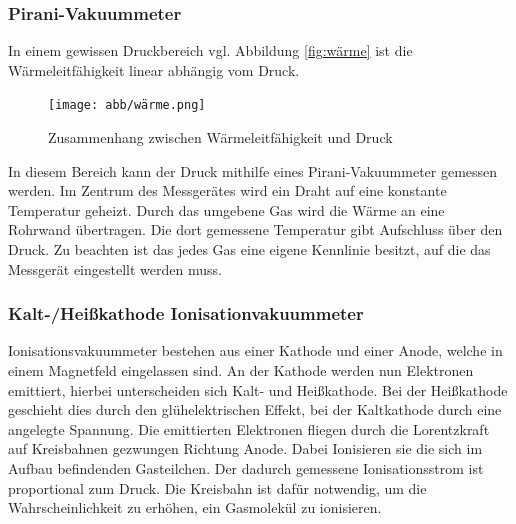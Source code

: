 \subsubsection{Pirani-Vakuummeter}
In einem gewissen Druckbereich vgl. Abbildung \eqref{fig:wärme} ist die Wärmeleitfähigkeit linear abhängig vom Druck.
\begin{figure}[h]
    \centering
    \texttt{[image: abb/wärme.png]}
    \caption{Zusammenhang zwischen Wärmeleitfähigkeit und Druck \cite{Pfeifer}}
    \label{fig:wärme}
\end{figure}
In diesem Bereich kann der Druck mithilfe eines Pirani-Vakuummeter gemessen werden.
Im Zentrum des Messgerätes wird ein Draht auf eine konstante Temperatur geheizt.
Durch das umgebene Gas wird die Wärme an eine Rohrwand übertragen.
Die dort gemessene Temperatur gibt Aufschluss über den Druck.
Zu beachten ist das jedes Gas eine eigene Kennlinie besitzt,
auf die das Messgerät eingestellt werden muss.

\subsubsection{Kalt-/Heißkathode Ionisationvakuummeter}
Ionisationsvakuummeter bestehen aus einer Kathode und einer Anode,
welche in einem Magnetfeld eingelassen sind.
An der Kathode werden nun Elektronen emittiert,
hierbei unterscheiden sich Kalt- und Heißkathode.
Bei der Heißkathode geschieht dies durch den glühelektrischen Effekt,
bei der Kaltkathode durch eine angelegte Spannung.
Die emittierten Elektronen fliegen
durch die Lorentzkraft auf Kreisbahnen gezwungen
Richtung Anode.
Dabei Ionisieren sie die sich im Aufbau befindenden Gasteilchen.
Der dadurch gemessene Ionisationsstrom ist proportional zum Druck.
Die Kreisbahn ist dafür notwendig,
um die Wahrscheinlichkeit zu erhöhen, ein Gasmolekül zu ionisieren. 
